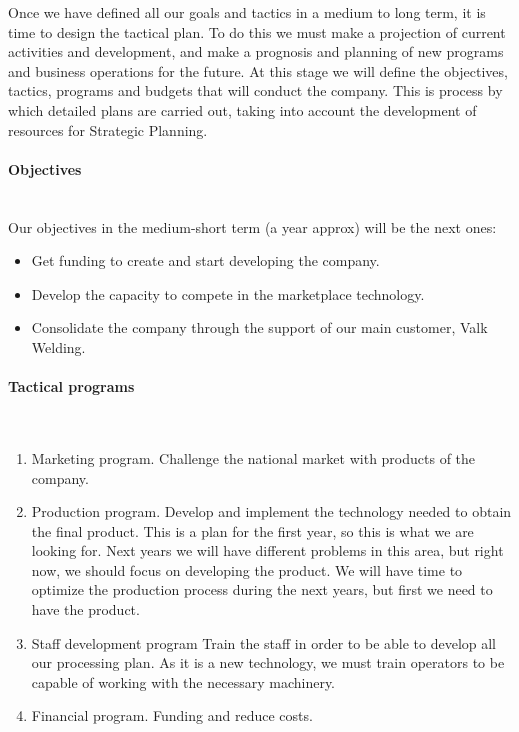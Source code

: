 Once we have defined all our goals and tactics in a medium to long term, it is time to design the tactical plan. To do this we must make a projection of current activities and development, and make a prognosis and planning of new programs and business operations for the future. At this stage we will define the objectives, tactics, programs and budgets that will conduct the company. This is process by which detailed plans are carried out, taking into account the development of resources for Strategic Planning.

\paragraph*{Objectives}~\\
Our objectives in the medium-short term (a year approx) will be the next ones:
\begin{itemize}[-]
\item Get funding to create and start developing the company.
\item Develop the capacity to compete in the marketplace technology.
\item Consolidate the company through the support of our main customer, Valk Welding.
\end{itemize}

\paragraph*{Tactical programs}~\\

\begin{enumerate}
\item Marketing program.
      Challenge the national market with products of the company.
\item Production program.
	Develop and implement the technology needed to obtain the final product.
	This is a plan for the first year, so this is what we are looking for. 
	Next years we will have different problems in this area, but right now, we should focus on developing the product. 
	We will have time to optimize the production process during the next years, but first we need to have the product.
\item Staff development program
	Train the staff in order to be able to develop all our processing plan.
	As it is a new technology, we must train operators to be capable of working with the necessary machinery.
\item Financial program.
      Funding and reduce costs.	
\end{enumerate}


